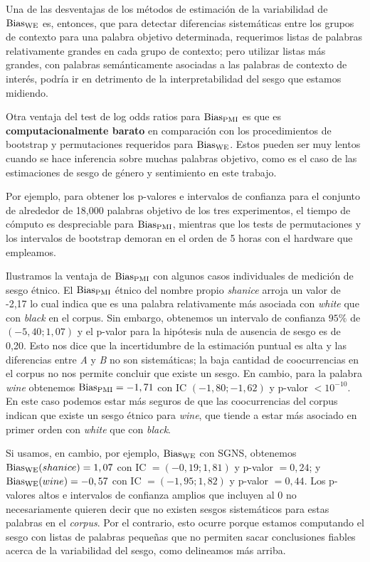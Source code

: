 
Una de las desventajas de los métodos de estimación de la variabilidad de $\operatorname{Bias_{WE}}$ es, entonces, que para detectar diferencias sistemáticas entre los grupos de contexto para una palabra objetivo determinada, requerimos listas de palabras relativamente grandes en cada grupo de contexto; pero utilizar listas más grandes, con palabras semánticamente asociadas a las palabras de contexto de interés, podría ir en detrimento de la interpretabilidad del sesgo que estamos midiendo. 

Otra ventaja del test de log odds ratios para $\operatorname{Bias_{PMI}}$ es que es \textbf{computacionalmente barato} en comparación con los procedimientos de bootstrap y permutaciones requeridos para $\operatorname{Bias_{WE}}$. Estos pueden ser muy lentos cuando se hace inferencia sobre muchas palabras objetivo, como es el caso de las estimaciones de sesgo de género y sentimiento en este trabajo.


Por ejemplo, para obtener los p-valores e intervalos de confianza para el conjunto de alrededor de 18,000 palabras objetivo de los tres experimentos, el tiempo de cómputo es despreciable para $\operatorname{Bias_{PMI}}$, mientras que los tests de permutaciones y los intervalos de bootstrap demoran en el orden de 5 horas con el hardware que empleamos. 

Ilustramos la ventaja de $\operatorname{Bias_{PMI}}$ con algunos casos individuales de medición de sesgo étnico. El $\operatorname{Bias_{PMI}}$ étnico del nombre propio \emph{shanice} arroja un valor de -2,17 lo cual indica que es una palabra relativamente más asociada con \emph{white} que con \emph{black} en el corpus. Sin embargo, obtenemos un intervalo de confianza $95\%$ de $(-5,40; 1,07)$ y el p-valor para la hipótesis nula de ausencia de sesgo es de 0,20. Esto nos dice que la incertidumbre de la estimación puntual es alta y las diferencias entre \emph{A} y \emph{B} no son sistemáticas; la baja cantidad de coocurrencias en el corpus no nos permite concluir que existe un sesgo. En cambio, para la palabra \emph{wine} obtenemos $\operatorname{Bias_{PMI}} = -1,71$ con IC $(-1,80; -1,62)$ y p-valor $< 10^{-10}$. En este caso podemos estar más seguros de que las coocurrencias del corpus indican que existe un sesgo étnico para \emph{wine}, que tiende a estar más asociado en primer orden con \emph{white} que con \emph{black}. 


Si usamos, en cambio, por ejemplo, $\operatorname{Bias_{WE}}$ con SGNS, obtenemos $\operatorname{Bias_{WE}}(shanice) = 1,07$ con IC $=(-0,19; 1,81)$ y p-valor $= 0,24$; y $\operatorname{Bias_{WE}}(wine) = -0,57$ con IC $=(-1,95; 1,82)$ y p-valor $= 0,44$. Los p-valores altos e intervalos de confianza amplios que incluyen al 0 no necesariamente quieren decir que no existen sesgos sistemáticos para estas palabras en el \emph{corpus}. Por el contrario, esto ocurre porque estamos computando el sesgo con listas de palabras pequeñas que no permiten sacar conclusiones fiables acerca de la variabilidad del sesgo, como delineamos más arriba. 

